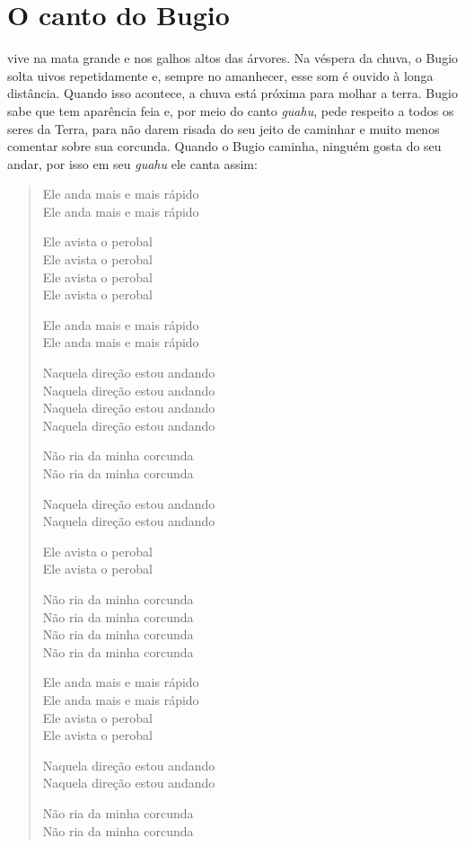 \chapter{O canto do Bugio}

 vive na mata grande e nos galhos altos das árvores. Na véspera da
chuva, o Bugio solta uivos repetidamente e, sempre no amanhecer, esse
som é ouvido à longa distância. Quando isso acontece, a chuva está
próxima para molhar a terra. Bugio sabe que tem aparência feia e, por
meio do canto \textit{guahu}, pede respeito a todos os seres da Terra,
para não darem risada do seu jeito de caminhar e muito menos comentar
sobre sua corcunda. Quando o Bugio caminha, ninguém gosta do seu andar,
por isso em seu \textit{guahu} ele canta assim:

\begin{verse}
Ele anda mais e mais rápido\footnotemark{}\\
Ele anda mais e mais rápido

Ele avista o perobal\footnotemark{}\\
Ele avista o perobal\\
Ele avista o perobal\\
Ele avista o perobal

Ele anda mais e mais rápido\\
Ele anda mais e mais rápido

Naquela direção estou andando\\
Naquela direção estou andando\\
Naquela direção estou andando\\
Naquela direção estou andando

Não ria da minha corcunda\\
Não ria da minha corcunda

Naquela direção estou andando\\
Naquela direção estou andando

Ele avista o perobal\\
Ele avista o perobal

Não ria da minha corcunda\\
Não ria da minha corcunda\\
Não ria da minha corcunda\\
Não ria da minha corcunda	

Ele anda mais e mais rápido\\
Ele anda mais e mais rápido\\
Ele avista o perobal\\
Ele avista o perobal

Naquela direção estou andando\\
Naquela direção estou andando

Não ria da minha corcunda\\
Não ria da minha corcunda
\end{verse}

